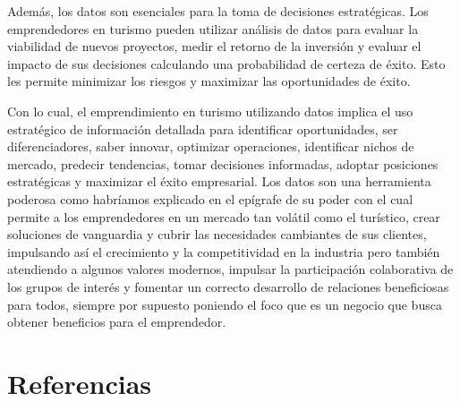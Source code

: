 \documentclass[
  letterpaper,
  DIV=11,
  numbers=noendperiod]{scrreprt}
\begin{document}
Además, los datos son esenciales para la toma de decisiones
estratégicas. Los emprendedores en turismo pueden utilizar análisis de
datos para evaluar la viabilidad de nuevos proyectos, medir el retorno
de la inversión y evaluar el impacto de sus decisiones calculando una
probabilidad de certeza de éxito. Esto les permite minimizar los riesgos
y maximizar las oportunidades de éxito.

Con lo cual, el emprendimiento en turismo utilizando datos implica el
uso estratégico de información detallada para identificar oportunidades,
ser diferenciadores, saber innovar, optimizar operaciones, identificar
nichos de mercado, predecir tendencias, tomar decisiones informadas,
adoptar posiciones estratégicas y maximizar el éxito empresarial. Los
datos son una herramienta poderosa como habríamos explicado en el
epígrafe de su poder con el cual permite a los emprendedores en un
mercado tan volátil como el turístico, crear soluciones de vanguardia y
cubrir las necesidades cambiantes de sus clientes, impulsando así el
crecimiento y la competitividad en la industria pero también atendiendo
a algunos valores modernos, impulsar la participación colaborativa de
los grupos de interés y fomentar un correcto desarrollo de relaciones
beneficiosas para todos, siempre por supuesto poniendo el foco que es un
negocio que busca obtener beneficios para el emprendedor.

\hypertarget{referencias}{%
\section{Referencias}\label{referencias}}
\end{document}
